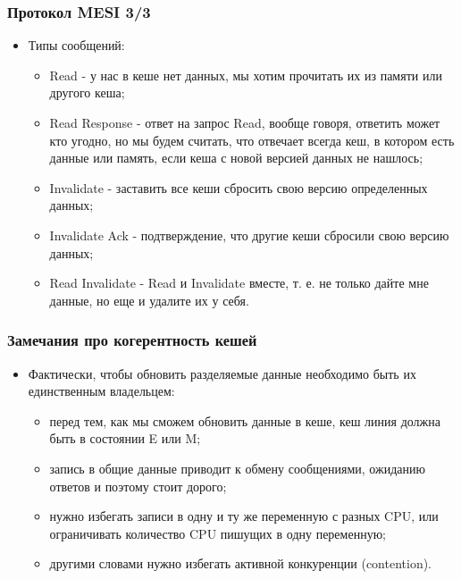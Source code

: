 \begin{frame}
\frametitle{Протокол MESI 3/3}
\begin{itemize}
  \item Типы сообщений:
  \begin{itemize}
    \item Read - у нас в кеше нет данных, мы хотим прочитать их из памяти или
    другого кеша;
    \item Read Response - ответ на запрос Read, вообще говоря, ответить может
    кто угодно, но мы будем считать, что отвечает всегда кеш, в котором есть
    данные или память, если кеша с новой версией данных не нашлось;
    \item Invalidate - заставить все кеши сбросить свою версию определенных
    данных;
    \item Invalidate Ack - подтверждение, что другие кеши сбросили свою версию
    данных;
    \item Read Invalidate - Read и Invalidate вместе, т. е. не только дайте мне
    данные, но еще и удалите их у себя.
  \end{itemize}
\end{itemize}
\end{frame}

\begin{frame}
\frametitle{Замечания про когерентность кешей}
\begin{itemize}
  \item Фактически, чтобы обновить разделяемые данные необходимо быть их
  единственным владельцем:
  \begin{itemize}
    \item перед тем, как мы сможем обновить данные в кеше, кеш линия должна быть
    в состоянии E или M;
    \item запись в общие данные приводит к обмену сообщениями, ожиданию ответов
    и поэтому стоит дорого;
    \item нужно избегать записи в одну и ту же переменную с разных CPU, или
    ограничивать количество CPU пишущих в одну переменную;
    \item другими словами нужно избегать активной конкуренции (contention).
  \end{itemize}
\end{itemize}
\end{frame}
